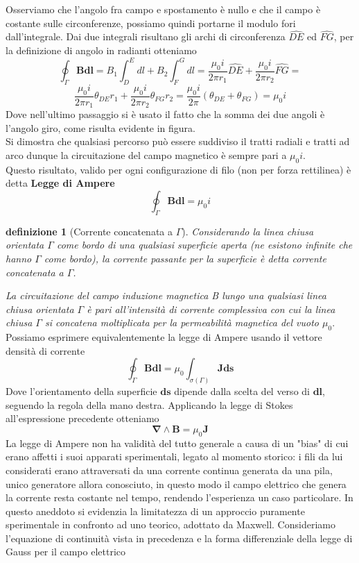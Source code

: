 \documentclass[10pt,a4paper]{article}
\newtheorem{definizione}{definizione}
\begin{document}
Osserviamo che l'angolo fra campo e spostamento è nullo e che il campo è costante sulle circonferenze, possiamo quindi portarne il modulo fori dall'integrale. Dai due integrali risultano gli archi di circonferenza \(\widehat{DE}\) ed \(\widehat{FG}\), per la definizione di angolo in radianti otteniamo
\[\oint_{\Gamma}\mathbf{B}\mathbf{dl}=B_1\int_{D}^{E}dl+B_2\int_{F}^{G}dl= \frac{\mu_0 i}{2\pi r_1}\widehat{DE}+\frac{\mu_0 i}{2\pi r_2}\widehat{FG}=\]
 \[\frac{\mu_0 i}{2\pi r_1}\theta_{DE}r_1+\frac{\mu_0 i}{2\pi r_2}\theta_{FG}r_2=\frac{\mu_0 i}{2\pi}(\theta_{DE}+\theta_{FG})=\mu_0 i \]
Dove nell'ultimo passaggio si è usato il fatto che la somma dei due angoli è l'angolo giro, come risulta evidente in figura.\\
Si dimostra che qualsiasi percorso può essere suddiviso il tratti radiali e tratti ad arco dunque la circuitazione del campo magnetico è sempre pari a \(\mu_0 i\).\\
Questo risultato, valido per ogni configurazione di filo (non per forza rettilinea) è detta \textbf{Legge di Ampere}
\[\oint_{\Gamma}\mathbf{B}\mathbf{dl}=\mu_0 i\] 
\begin{definizione}[Corrente concatenata a $\Gamma$]
	Considerando la linea chiusa orientata $\Gamma$ come bordo di una qualsiasi superficie aperta (ne esistono infinite che hanno $\Gamma$ come bordo), la corrente passante per la superficie è detta corrente concatenata a $\Gamma$.
\end{definizione}
\textit{La circuitazione del campo induzione magnetica B lungo una qualsiasi linea chiusa orientata \(\Gamma\) è pari all'intensità di corrente complessiva con cui la linea chiusa $\Gamma$ si concatena moltiplicata per la permeabilità magnetica del vuoto $\mu_0$}.\\
Possiamo esprimere equivalentemente la legge di Ampere usando il vettore densità di corrente
\[\oint_{\Gamma}\mathbf{B}\mathbf{dl}= \mu_0\int_{\sigma(\Gamma)}\mathbf{J}\mathbf{ds}\]
Dove l'orientamento della superficie $\mathbf{ds}$ dipende dalla scelta del verso di $\mathbf{dl}$, seguendo la regola della mano destra. 
Applicando la legge di Stokes all'espressione precedente otteniamo
\[\mathbf{\nabla}\wedge\mathbf{B}=\mu_0\mathbf{J}\]
La legge di Ampere non ha validità del tutto generale a causa di un "bias" di cui erano affetti i suoi apparati sperimentali, legato al momento storico: i fili da lui considerati erano attraversati da una corrente continua generata da una pila, unico generatore allora conosciuto, in questo modo il campo elettrico che genera la corrente resta costante nel tempo, rendendo l'esperienza un caso particolare. In questo aneddoto si evidenzia la limitatezza di un approccio puramente sperimentale in confronto ad uno teorico, adottato da Maxwell. Consideriamo l'equazione di continuità vista in precedenza e la forma differenziale della legge di Gauss per il campo elettrico
\end{document}
